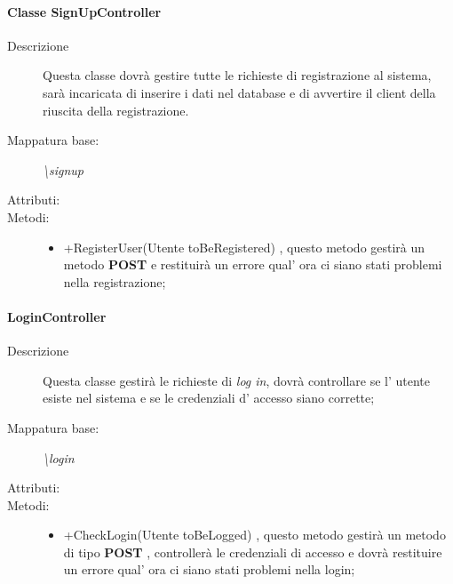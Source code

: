 \paragraph{Classe SignUpController}%
\begin{description}
	\item[Descrizione] Questa classe dovrà gestire tutte le richieste di registrazione al sistema, sarà incaricata di inserire i dati nel database e di avvertire il client della riuscita della registrazione.
	\item[Mappatura base:] \textit{\textbackslash signup}
	\item[Attributi:]
	\item[Metodi:]\begin{itemize}
					\item +RegisterUser(Utente toBeRegistered) , questo metodo gestirà un metodo \textbf{POST} e restituirà un errore qual' ora ci siano stati problemi nella registrazione;
				\end{itemize}
\end{description}
\paragraph{LoginController}%
\begin{description}
	\item[Descrizione] Questa classe gestirà le richieste di \textit{log in}, dovrà controllare se l' utente esiste nel sistema e se le credenziali d' accesso siano corrette;
	\item[Mappatura base:] \textit{\textbackslash login}
	\item[Attributi:]
	\item[Metodi:]\begin{itemize}
					\item +CheckLogin(Utente toBeLogged) , questo metodo gestirà un metodo di tipo \textbf{POST} , controllerà le credenziali di accesso e dovrà restituire un errore qual' ora ci siano stati problemi nella login;
				\end{itemize}
\end{description}
